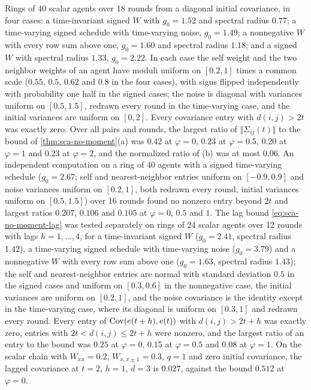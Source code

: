 \begin{numcheck}\label{chk:sca-no-moment}
Rings of 40 scalar agents over 18 rounds from a diagonal initial covariance, in four cases: a time-invariant signed $W$ with $g_0=1.52$ and spectral radius $0.77$; a time-varying signed schedule with time-varying noise, $g_0=1.49$; a nonnegative $W$ with every row sum above one, $g_0=1.60$ and spectral radius $1.18$; and a signed $W$ with spectral radius $1.33$, $g_0=2.22$. In each case the self weight and the two neighbor weights of an agent have moduli uniform on $[0.2,1]$ times a common scale ($0.55$, $0.5$, $0.62$ and $0.8$ in the four cases), with signs flipped independently with probability one half in the signed cases; the noise is diagonal with variances uniform on $[0.5,1.5]$, redrawn every round in the time-varying case, and the initial variances are uniform on $[0,2]$. Every covariance entry with $d(i,j)>2t$ was exactly zero. Over all pairs and rounds, the largest ratio of $\Vert\Sigma_{ij}(t)\Vert$ to the bound of \cref{thm:sca-no-moment}(a) was $0.42$ at $\varphi=0$, $0.23$ at $\varphi=0.5$, $0.20$ at $\varphi=1$ and $0.23$ at $\varphi=2$, and the normalized ratio of (b) was at most $0.06$. An independent computation on a ring of 40 agents with a signed time-varying schedule ($g_0=2.67$; self and nearest-neighbor entries uniform on $[-0.9,0.9]$ and noise variances uniform on $[0.2,1]$, both redrawn every round, initial variances uniform on $[0.5,1.5]$) over 16 rounds found no nonzero entry beyond $2t$ and largest ratios $0.207$, $0.106$ and $0.105$ at $\varphi=0$, $0.5$ and $1$. The lag bound \eqref{eq:sca-no-moment-lag} was tested separately on rings of 24 scalar agents over 12 rounds with lags $h=1,\dots,4$, for a time-invariant signed $W$ ($g_0=2.41$, spectral radius $1.42$), a time-varying signed schedule with time-varying noise ($g_0=3.79$) and a nonnegative $W$ with every row sum above one ($g_0=1.63$, spectral radius $1.43$); the self and nearest-neighbor entries are normal with standard deviation $0.5$ in the signed cases and uniform on $[0.3,0.6]$ in the nonnegative case, the initial variances are uniform on $[0.2,1]$, and the noise covariance is the identity except in the time-varying case, where its diagonal is uniform on $[0.3,1]$ and redrawn every round. Every entry of $\operatorname{Cov}(e(t+h),e(t))$ with $d(i,j)>2t+h$ was exactly zero, entries with $2t<d(i,j)\le2t+h$ were nonzero, and the largest ratio of an entry to the bound was $0.25$ at $\varphi=0$, $0.15$ at $\varphi=0.5$ and $0.08$ at $\varphi=1$. On the scalar chain with $W_{xx}=0.2$, $W_{x,x\pm1}=0.3$, $q=1$ and zero initial covariance, the lagged covariance at $t=2$, $h=1$, $d=3$ is $0.027$, against the bound $0.512$ at $\varphi=0$.
\end{numcheck}

